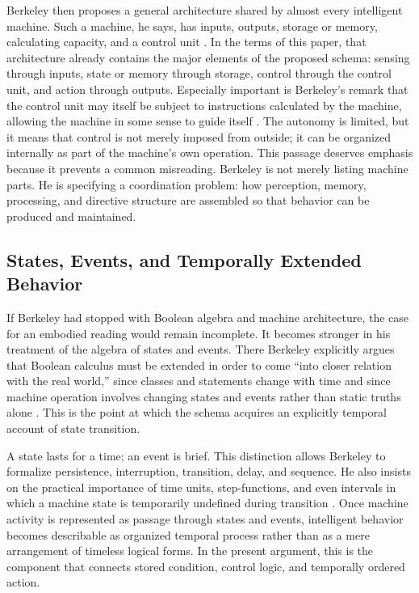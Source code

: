 \documentclass[11pt]{article}
\begin{document}
Berkeley then proposes a general architecture shared by almost every intelligent machine. Such a machine, he says, has inputs, outputs, storage or memory, calculating capacity, and a control unit \citep[p.~70]{berkeley1959symbolic}. In the terms of this paper, that architecture already contains the major elements of the proposed schema: sensing through inputs, state or memory through storage, control through the control unit, and action through outputs. Especially important is Berkeley's remark that the control unit may itself be subject to instructions calculated by the machine, allowing the machine in some sense to guide itself \citep[p.~70]{berkeley1959symbolic}. The autonomy is limited, but it means that control is not merely imposed from outside; it can be organized internally as part of the machine's own operation. This passage deserves emphasis because it prevents a common misreading. Berkeley is not merely listing machine parts. He is specifying a coordination problem: how perception, memory, processing, and directive structure are assembled so that behavior can be produced and maintained.

\subsection*{States, Events, and Temporally Extended Behavior}

If Berkeley had stopped with Boolean algebra and machine architecture, the case for an embodied reading would remain incomplete. It becomes stronger in his treatment of the algebra of states and events. There Berkeley explicitly argues that Boolean calculus must be extended in order to come ``into closer relation with the real world,'' since classes and statements change with time and since machine operation involves changing states and events rather than static truths alone \citep[pp.~145--147]{berkeley1959symbolic}. This is the point at which the schema acquires an explicitly temporal account of state transition.

A state lasts for a time; an event is brief. This distinction allows Berkeley to formalize persistence, interruption, transition, delay, and sequence. He also insists on the practical importance of time units, step-functions, and even intervals in which a machine state is temporarily undefined during transition \citep[pp.~145--147]{berkeley1959symbolic}. Once machine activity is represented as passage through states and events, intelligent behavior becomes describable as organized temporal process rather than as a mere arrangement of timeless logical forms. In the present argument, this is the component that connects stored condition, control logic, and temporally ordered action.
\end{document}
